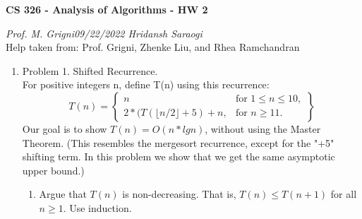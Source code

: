\documentclass[11pt]{article}
\begin{document}
\begin{center}
    \textbf{CS 326 - Analysis of Algorithms - HW 2}\\
\end{center}


\begin{flushleft}
    \textit{Prof. M. Grigni\hfill09/22/2022 \hfill Hridansh Saraogi} \\
    \vspace{0.15cm}
    \small {Help taken from: Prof. Grigni, Zhenke Liu, and Rhea Ramchandran}
\end{flushleft}


\begin{enumerate}

\item Problem 1. Shifted Recurrence. \\
For positive integers n, define T(n) using this recurrence:
\begin{equation}
T(n) = 
\left\{
    \begin{array}{lr}
        n & \text{for }  1 \leq n \leq 10,\\
        2*(T( \lfloor n/2 \rfloor + 5)+n, & \text{for } n\geq 11.
    \end{array}
\right\}
\end{equation}
Our goal is to show $T(n) = O(n*lg n)$, without using the Master Theorem. (This resembles the mergesort recurrence, except for the "+5" shifting term. In this problem we show that we get the same asymptotic upper bound.)

    \begin{enumerate}
        \item Argue that $T(n)$ is non-decreasing. That is, $T(n) \leq T(n+1)$ for all $n \geq 1$. Use induction.
        

\end{enumerate}
\end{enumerate}
\end{document}
